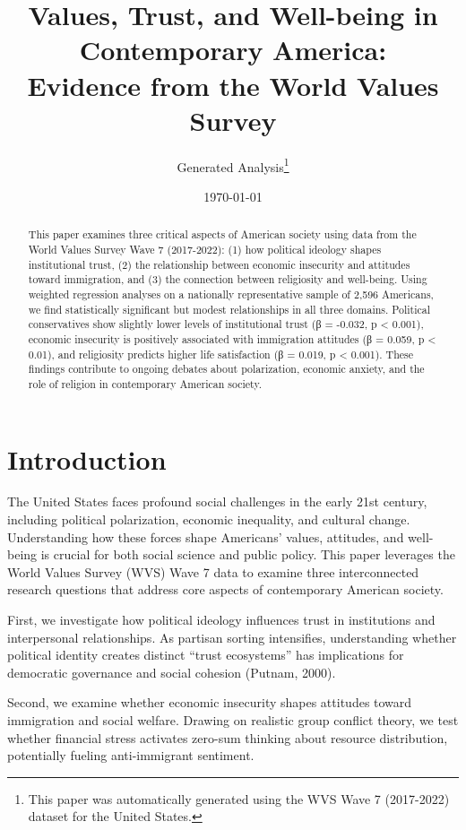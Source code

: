 \documentclass[12pt,a4paper]{article}
\title{Values, Trust, and Well-being in Contemporary America: \\
Evidence from the World Values Survey}
\author{Generated Analysis\thanks{This paper was automatically generated using 
the WVS Wave 7 (2017-2022) dataset for the United States.}}
\date{\today}
\begin{document}
\maketitle

\begin{abstract}
This paper examines three critical aspects of American society using data from the 
World Values Survey Wave 7 (2017-2022): (1) how political ideology shapes 
institutional trust, (2) the relationship between economic insecurity and attitudes 
toward immigration, and (3) the connection between religiosity and well-being. 
Using weighted regression analyses on a nationally representative sample of 2,596 
Americans, we find statistically significant but modest relationships in all three 
domains. Political conservatives show slightly lower levels of institutional trust 
(β = -0.032, p < 0.001), economic insecurity is positively associated with 
immigration attitudes (β = 0.059, p < 0.01), and religiosity predicts higher 
life satisfaction (β = 0.019, p < 0.001). These findings contribute to ongoing 
debates about polarization, economic anxiety, and the role of religion in 
contemporary American society.
\end{abstract}

\section{Introduction}

The United States faces profound social challenges in the early 21st century, 
including political polarization, economic inequality, and cultural change. 
Understanding how these forces shape Americans' values, attitudes, and well-being 
is crucial for both social science and public policy. This paper leverages the 
World Values Survey (WVS) Wave 7 data to examine three interconnected research 
questions that address core aspects of contemporary American society.

First, we investigate how political ideology influences trust in institutions and 
interpersonal relationships. As partisan sorting intensifies, understanding whether 
political identity creates distinct ``trust ecosystems'' has implications for 
democratic governance and social cohesion (Putnam, 2000).

Second, we examine whether economic insecurity shapes attitudes toward immigration 
and social welfare. Drawing on realistic group conflict theory, we test whether 
financial stress activates zero-sum thinking about resource distribution, 
potentially fueling anti-immigrant sentiment.
\end{document}
